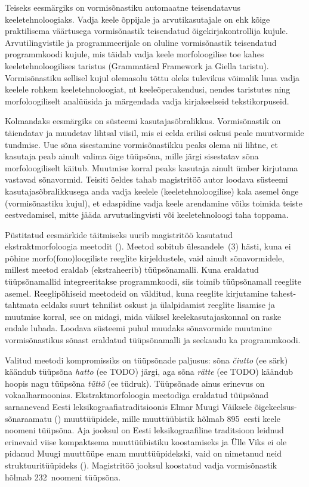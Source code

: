 \documentclass[12pt,a4paper]{article}
\newcommand{\vadja}[1]{\textit{#1}}
\begin{document}
Teiseks eesmärgiks on vormisõnastiku automaatne teisendatavus keele\-tehnoloogiaks. Vadja keele õppijale ja arvuti\-kasutajale on ehk kõige praktilisema väärtusega vormi\-sõnastik teisendatud õigekirja\-kontrollija kujule. Arvuti\-lingvistile ja programmeerijale on oluline vormi\-sõnastik teisendatud programm\-koodi kujule, mis täidab vadja keele morfoloogilise toe kahes keele\-tehnoloogilises taristus (Grammatical Framework ja Giella taristu). Vormi\-sõnastiku sellisel kujul olemas\-olu tõttu oleks tulevikus võimalik luua vadja keelele rohkem keeletehnoloogiat, nt keeleõpe\-rakendusi, nendes taristutes ning morfoloogiliselt analüüsida ja märgendada vadja kirja\-keelseid teksti\-korpuseid.

Kolmandaks eesmärgiks on süsteemi kasutaja\-sõbralikkus. Vormi\-sõnastik on täiendatav ja muudetav lihtsal viisil, mis ei eelda erilisi oskusi peale muutvormide tundmise. Uue sõna sisestamine vormi\-sõnastikku peaks olema nii lihtne, et kasutaja peab ainult valima õige tüüpsõna, mille järgi sisestatav sõna morfoloogiliselt käitub. Muutmise korral peaks kasutaja ainult ümber kirjutama vastavad sõna\-vormid. Teisiti öeldes tahab magistritöö autor loodava süsteemi kasutaja\-sõbralikkusega anda vadja keelele (keele\-tehnoloogilise) kala asemel õnge (vormisõnastiku kujul), et edaspidine vadja keele arendamine võiks toimida teiste eest\-vedamisel, mitte jääda arvutus\-lingvisti või keele\-tehnoloogi taha toppama.

Püstitatud eesmärkide täitmiseks uurib magistritöö kasutatud ekstrakt\-morfoloogia meetodit (\cite{ahlberg_semi-supervised_2014}). Meetod sobitub ülesandele~(3) hästi, kuna ei põhine morfo(fono)loogiliste reeglite kirjeldustele, vaid ainult sõnavormidele, millest meetod eraldab (ekstraheerib) tüüpsõna\-malli. Kuna eraldatud tüüpsõna\-mallid integreeritakse programm\-koodi, siis toimib tüüp\-sõna\-mall reeglite asemel. %
Reeglipõhiseid meetodeid on välditud, kuna reeglite kirjutamine tahest-tahtmata eeldaks suurt tehnilist oskust ja ülalpidamist reeglite lisamise ja muutmise korral, see on midagi, mida väiksel keele\-kasutajas\-konnal on raske endale lubada. Loodava süsteemi puhul muudaks sõnavormide muutmine vormisõnastikus sõnast eraldatud tüüpsõna\-malli ja seekaudu ka programm\-koodi.


Valitud meetodi kompromissiks on tüüpsõnade paljusus: sõna \vadja{čiutto} (ee särk) käändub tüüpsõna \vadja{hatto} (ee TODO) järgi, aga sõna \vadja{rätte} (ee TODO) käändub hoopis nagu tüüpsõna \vadja{tüttö} (ee tüdruk). Tüüp\-sõnade ainus erinevus on vokaalharmoonias. Ekstrakt\-morfoloogia meetodiga eraldatud tüüpsõnad sarnanevead Eesti leksikograafia\-traditsioonis Elmar Muugi Väiksele õigekeelsus-sõnaraamatu (\citeyear{muuk_vaike_1933}) muuttüüpidele, mille muuttüübistik hõlmab 895~eesti keele noomeni tüüpsõna. Aja jooksul on Eesti leksikograafiline traditsioon leidnud erinevaid viise kompaktsema muuttüübistiku koostamiseks ja Ülle Viks ei ole pidanud Muugi muuttüüpe enam muuttüüpidekski, vaid on nimetanud neid struktuuri\-tüüpideks (\cite[282]{viks_verbide_1976}). Magistritöö jooksul koostatud vadja vormisõnastik hõlmab 232~noomeni tüüpsõna. %
\end{document}
